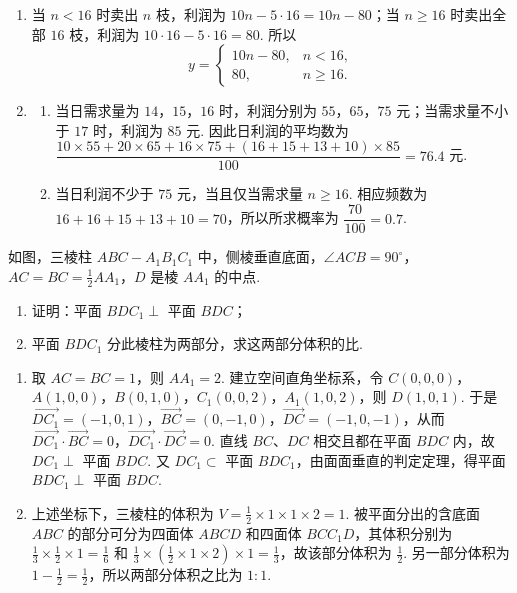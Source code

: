 \begin{solution}
\begin{enumerate}
\item 当 \(n<16\) 时卖出 \(n\) 枝，利润为 \(10n-5\cdot16=10n-80\)；当 \(n\geqslant16\) 时卖出全部 \(16\) 枝，利润为 \(10\cdot16-5\cdot16=80\). 所以
\[
y=\begin{cases}
10n-80,&n<16,\\
80,&n\geqslant16.
\end{cases}
\]
\item
\begin{enumerate}
\item 当日需求量为 \(14\)，\(15\)，\(16\) 时，利润分别为 \(55\)，\(65\)，\(75\) 元；当需求量不小于 \(17\) 时，利润为 \(85\) 元. 因此日利润的平均数为
\(\dfrac{10\times55+20\times65+16\times75+(16+15+13+10)\times85}{100}=76.4\) 元.
\item 当日利润不少于 \(75\) 元，当且仅当需求量 \(n\geqslant16\). 相应频数为 \(16+16+15+13+10=70\)，所以所求概率为 \(\dfrac{70}{100}=0.7\).
\end{enumerate}
\end{enumerate}
\end{solution}

\begin{problem}
如图，三棱柱 \(ABC - A_{1}B_{1}C_{1}\) 中，侧棱垂直底面，\(\angle ACB = 90^{\circ}\)，\(AC = BC = \frac{1}{2} AA_{1}\)，\(D\) 是棱 \(AA_{1}\) 的中点.

\begin{enumerate}
\item 证明：平面 \(BDC_{1} \perp\) 平面 \(BDC\)；
\item 平面 \(BDC_{1}\) 分此棱柱为两部分，求这两部分体积的比.
\end{enumerate}

\end{problem}

\begin{solution}
\begin{enumerate}
\item 取 \(AC=BC=1\)，则 \(AA_1=2\). 建立空间直角坐标系，令 \(C(0,0,0)\)，\(A(1,0,0)\)，\(B(0,1,0)\)，\(C_1(0,0,2)\)，\(A_1(1,0,2)\)，则 \(D(1,0,1)\). 于是 \(\overrightarrow{DC_1}=(-1,0,1)\)，\(\overrightarrow{BC}=(0,-1,0)\)，\(\overrightarrow{DC}=(-1,0,-1)\)，从而 \(\overrightarrow{DC_1}\cdot\overrightarrow{BC}=0\)，\(\overrightarrow{DC_1}\cdot\overrightarrow{DC}=0\). 直线 \(BC\)、\(DC\) 相交且都在平面 \(BDC\) 内，故 \(DC_1\perp\) 平面 \(BDC\). 又 \(DC_1\subset\) 平面 \(BDC_1\)，由面面垂直的判定定理，得平面 \(BDC_1\perp\) 平面 \(BDC\).
\item 上述坐标下，三棱柱的体积为 \(V=\frac12\times1\times1\times2=1\). 被平面分出的含底面 \(ABC\) 的部分可分为四面体 \(ABCD\) 和四面体 \(BCC_1D\)，其体积分别为 \(\frac13\times\frac12\times1=\frac16\) 和 \(\frac13\times(\frac12\times1\times2)\times1=\frac13\)，故该部分体积为 \(\frac12\). 另一部分体积为 \(1-\frac12=\frac12\)，所以两部分体积之比为 \(1:1\).
\end{enumerate}
\end{solution}

